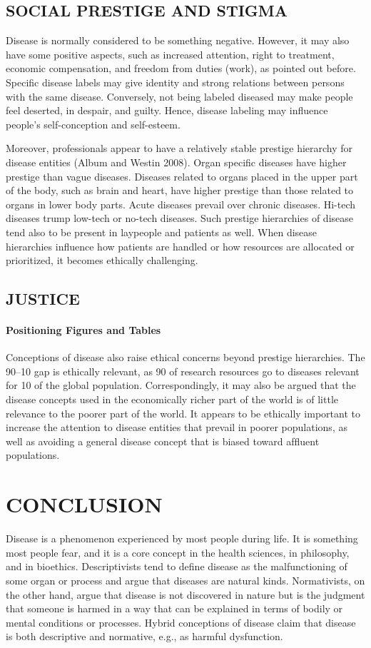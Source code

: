 \documentclass[conference]{IEEEtran}
\begin{document}
\subsection{SOCIAL PRESTIGE AND STIGMA}
Disease is normally considered to be something negative. However, it may also have some positive aspects, such as increased attention, right to treatment, economic compensation, and freedom from duties (work), as pointed out before. Speciﬁc disease labels may give identity and strong relations between persons with the same disease. Conversely, not being labeled diseased may make people feel deserted, in despair, and guilty. Hence, disease labeling may inﬂuence people’s self-conception and self-esteem.

\cite{b8}Moreover, professionals appear to have a relatively stable prestige hierarchy for disease entities (Album and Westin 2008). Organ speciﬁc diseases have higher prestige than vague diseases. Diseases related to organs placed in the upper part of the body, such as brain and heart, have higher prestige than those related to organs in lower body parts. Acute diseases prevail over chronic diseases. Hi-tech diseases trump low-tech or no-tech diseases. Such prestige hierarchies of disease tend also to be present in laypeople and patients as well. When disease hierarchies inﬂuence how patients are handled or how resources are allocated or prioritized, it becomes ethically challenging.

\subsection{JUSTICE}
\paragraph{Positioning Figures and Tables} 
Conceptions of disease also raise ethical concerns beyond prestige hierarchies. \cite{b9}The 90–10 gap is ethically relevant, as 90  of research resources go to diseases relevant for 10  of the global population. Correspondingly, it may also be argued that the disease concepts used in the economically richer part of the world is of little relevance to the poorer part of the world. It appears to be ethically important to increase the attention to disease entities that prevail in poorer populations, as well as avoiding a general disease concept that is biased toward afﬂuent populations.


\section*{CONCLUSION}
\cite{b10}
Disease is a phenomenon experienced by most people during life. It is something most people fear, and it is a core concept in the health sciences, in philosophy, and in bioethics. Descriptivists tend to deﬁne disease as the malfunctioning of some organ or process and argue that diseases are natural kinds. Normativists, on the other hand, argue that disease is not discovered in nature but is the judgment that someone is harmed in a way that can be explained in terms of bodily or mental conditions or processes. Hybrid conceptions of disease claim that disease is both descriptive and normative, e.g., as harmful dysfunction.
\end{document}
